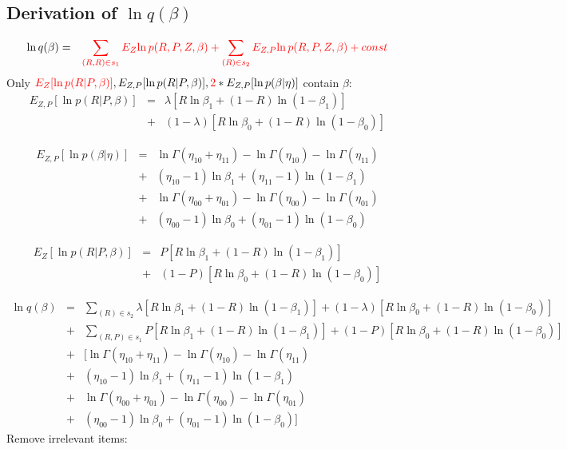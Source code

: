 \documentclass[11pt]{report}
\begin{document}
\subsection{Derivation of $\ln q(\beta)$}
\begin{eqnarray*}
    \ln q(\beta) 
    &=& \textcolor{red}{\sum_{(R,R)\in s_1}E_{Z}{\ln p(R,P,Z,\beta)} + \sum_{(R)\in s_2}E_{Z,P}{\ln p(R,P,Z,\beta)} + const }%
\end{eqnarray*}
Only $\textcolor{red}{E_{Z}[\ln p(R|P,\beta)]}, E_{Z,P}[\ln p(R|P,\beta)],\textcolor{red}{2}*E_{Z,P}[\ln p(\beta|\eta)]$ contain $\beta$:
\begin{eqnarray*}
    E_{Z,P}[\ln p(R|P,\beta)]&=&\lambda[R\ln\beta_{1}+(1-R)\ln (1-\beta_{1})]\\
    &+& (1-\lambda)[R\ln\beta_{0}+(1-R)\ln(1-\beta_{0})]
\end{eqnarray*}

\begin{eqnarray*}
    E_{Z,P}[\ln p(\beta|\eta)] &=& \ln \Gamma(\eta_{10}+\eta_{11}) - \ln \Gamma(\eta_{10})-\ln\Gamma(\eta_{11}) \\
    &+& (\eta_{10}-1)\ln\beta_{1}+(\eta_{11}-1)\ln(1-\beta_1) \\
    &+&\ln \Gamma(\eta_{00}+\eta_{01}) - \ln \Gamma(\eta_{00})-\ln\Gamma(\eta_{01}) \\
    &+&(\eta_{00}-1)\ln\beta_{0}+(\eta_{01}-1)\ln(1-\beta_0)
\end{eqnarray*}

\begin{eqnarray*}
E_{Z}[\ln p(R|P,\beta)] &=&P[R\ln\beta_{1}+(1-R)\ln (1-\beta_{1})]\\
    &+& (1-P)[R\ln\beta_{0}+(1-R)\ln(1-\beta_{0})]
\end{eqnarray*}


\begin{eqnarray*}
    \ln q(\beta) &=& \sum_{(R)\in s_2}\lambda[R\ln\beta_{1}+(1-R)\ln (1-\beta_{1})] +(1-\lambda)[R\ln\beta_{0}+(1-R)\ln(1-\beta_{0})] \\
    &+& \sum_{(R,P)\in s_1}P[R\ln\beta_{1}+(1-R)\ln (1-\beta_{1})] +(1-P)[R\ln\beta_{0}+(1-R)\ln(1-\beta_{0})] \\
    &+& [\ln \Gamma(\eta_{10}+\eta_{11}) - \ln \Gamma(\eta_{10})-\ln\Gamma(\eta_{11}) \\
    &+& (\eta_{10}-1)\ln\beta_{1}+(\eta_{11}-1)\ln(1-\beta_1) \\
    &+&\ln \Gamma(\eta_{00}+\eta_{01}) - \ln \Gamma(\eta_{00})-\ln\Gamma(\eta_{01}) \\
    &+&(\eta_{00}-1)\ln\beta_{0}+(\eta_{01}-1)\ln(1-\beta_0)]
\end{eqnarray*}
Remove irrelevant items:
\end{document}
